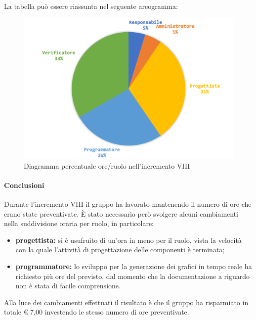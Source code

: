 		
		La tabella può essere riassunta nel seguente areogramma:
		\begin{figure}[H]
			\centering
			\includegraphics[width=0.8\linewidth]{images/consuntivo/ConsIncr8-2.png}
			\caption{Diagramma percentuale ore/ruolo nell'incremento VIII}
			\label{fig:consuntivo diagramma costi ruolo incremento VIII}
		\end{figure}
		
		\pagebreak
		
		\paragraph{Conclusioni}
			Durante l'incremento VIII il gruppo ha lavorato mantenendo il numero di ore che erano state preventivate. È stato necessario però svolgere alcuni cambiamenti nella suddivisione oraria per ruolo, in particolare:
		\begin{itemize}
			\item \textbf{progettista:} si è usufruito di un'ora in meno per il ruolo, vista la velocità con la quale l'attività di progettazione delle componenti è terminata;
			\item \textbf{programmatore:} lo sviluppo per la generazione dei grafici in tempo reale ha richiesto più ore del previsto, dal momento che la documentazione a riguardo non è stata di facile comprensione. 
		\end{itemize}
			Alla luce dei cambiamenti effettuati il risultato è che il gruppo ha risparmiato in totale € 7,00 investendo le stesso numero di ore preventivate.
		

